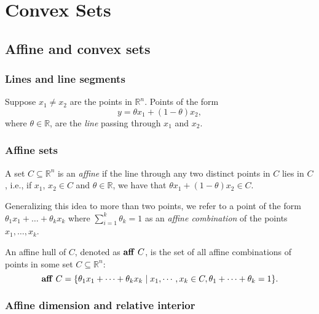 \documentclass{llncs}
\begin{document}
\chapter*{Convex Sets}

\section{Affine and convex sets}
\subsection{Lines and line segments}
Suppose $x_1 \ne x_2$ are the points in $\mathbb{R}^n$. Points of the form
\begin{equation}
    y = \theta x_1 + (1-\theta) x_2,
\end{equation}
where $\theta \in \mathbb{R}$, are the \textit{line} passing through $x_1$ and $x_2$.

\subsection{Affine sets}
A set $C \subseteq \mathbb{R}^n$ is an \textit{affine} if the line through any two distinct points in $C$ lies in $C$, i.e., if $x_1$, $x_2 \in C$ and $\theta \in \mathbb{R}$, we have that $\theta x_1 + (1-\theta) x_2 \in C$.

Generalizing this idea to more than two points, we refer to a point of the form $\theta_1 x_1 + \ldots + \theta_k x_k$ where $\sum_{i=1}^{k}\theta_k = 1$ as an \textit{affine combination} of the points $x_1, \ldots, x_k$. 

\begin{definition}
An affine hull of $C$, denoted as $\textup{\textbf{aff} } C$, is the set of all affine combinations of points in some set $C \subseteq \mathbb{R}^n$:
\begin{equation}
    \textup{\textbf{aff} } C = \{\theta_1 x_1 + \cdots + \theta_k x_k \mid x_1, \cdots, x_k \in C, \theta_1 + \cdots + \theta_k = 1\}.
\end{equation}
\end{definition}

\subsection{Affine dimension and relative interior}
\end{document}
